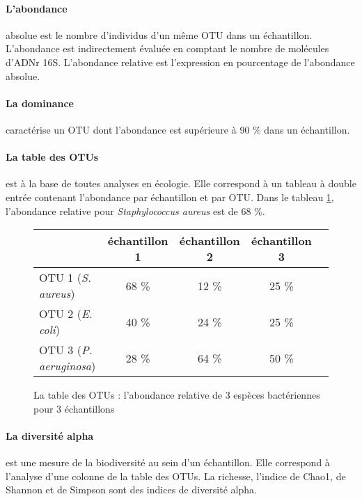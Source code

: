\documentclass[12pt,a4paper]{article}
\begin{document}
\paragraph{L'abondance} absolue est le nombre d'individus d'un même OTU dans un échantillon. L'abondance est indirectement évaluée en comptant le nombre de molécules d'ADNr 16S.
L’abondance relative est l'expression en pourcentage de l'abondance absolue.

\paragraph{La dominance} caractérise un OTU dont l'abondance est supérieure à 90 \% dans un échantillon. %


\paragraph{La table des OTUs} est à la base de toutes analyses en écologie. Elle correspond à un tableau à double entrée contenant l’abondance par échantillon et par OTU. Dans le tableau \ref{OTUTABLE}, l'abondance relative pour \textit{Staphylococcus aureus} est de 68 \%.

\begin{figure}[h]
\begin{center}
\begin{tabular}{|l|c|c|c|c}
  \hline
   & échantillon 1 & échantillon 2 & échantillon 3  \\
  \hline
  OTU 1 (\textit{S. aureus}) & 68 \% & 12 \% & 25 \% \\
  OTU 2 (\textit{E. coli})& 40 \% & 24 \% & 25 \% \\
  OTU 3 (\textit{P. aeruginosa}) & 28 \% & 64 \% & 50 \% \\

  \hline
\end{tabular}
\end{center}
\caption{La table des OTUs : l'abondance relative de 3 espèces bactériennes pour 3 échantillons}
\label{OTUTABLE}
\end{figure}

\paragraph{La diversité alpha} est une mesure de la biodiversité au sein d’un échantillon. Elle correspond à l'analyse d'une colonne de la table des OTUs. La richesse, l'indice de Chao1, de Shannon et de Simpson sont des indices de diversité alpha.
\end{document}
